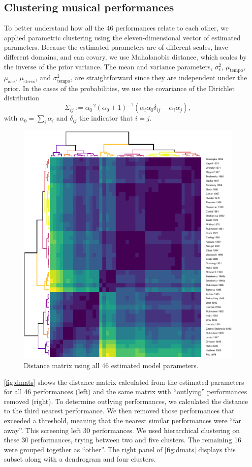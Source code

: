 \documentclass[aoas]{imsart}
\begin{document}
\subsection{Clustering musical performances}
\label{sec:clust-music-perf}

To better understand how all the 46 performances relate to each other,
we applied parametric clustering using the eleven-dimensional vector
of estimated parameters. Because the estimated parameters are of
different scales, have different domains, and can covary, we
use
Mahalanobis distance, which scales by the inverse of the prior variance. The mean and
variance parameters, $\sigma^2_\epsilon$, $\mu_{\textrm{tempo}}$,
$\mu_{\textrm{acc}}$, $\mu_{\textrm{stress}}$, and
$\sigma^2_{\textrm{tempo}}$, are straightforward since they are
independent under the prior. In the cases of the probabilities, we use
the covariance of the Dirichlet distribution
\begin{equation}
\Sigma_{ij} :=
  \alpha_0^{-2}(\alpha_0+1)^{-1}\left(\alpha_i\alpha_0 \delta_{ij}
    - \alpha_i\alpha_j\right),
\end{equation}
with
$\alpha_0=\sum_i\alpha_i$ and $\delta_{ij}$ the indicator that
$i=j$.


\begin{figure}[t]
  \centering
  \includegraphics[width=.65\linewidth]{parametric-clusters-2}
  \caption{Distance matrix using all 46 estimated model parameters. }
  \label{fig:dmats}
\end{figure}
\autoref{fig:dmats} shows the distance matrix calculated from the
estimated parameters for all 46 performances (left) and the same
matrix with ``outlying'' performances removed (right). To determine
outlying performances, we calculated the distance to the third nearest
performance. We then removed those performances that exceeded a
threshold, meaning that the nearest similar performances were ``far
away''. This screening left 30 performances. We used hierarchical
clustering on these 30 performances, trying between two and five
clusters. The remaining 16 were grouped together as ``other''. The
right panel of \autoref{fig:dmats} displays this subset along with a
dendrogram and four clusters.
\end{document}

